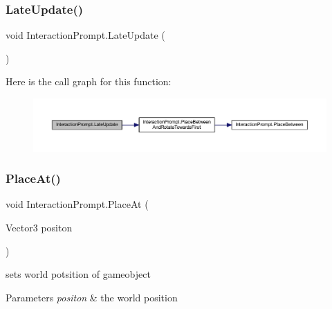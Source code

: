 \subsubsection{\texorpdfstring{Late\+Update()}{LateUpdate()}}
{\footnotesize\ttfamily void Interaction\+Prompt.\+Late\+Update (\begin{DoxyParamCaption}{ }\end{DoxyParamCaption})\hspace{0.3cm}{\ttfamily [private]}}

Here is the call graph for this function\+:\nopagebreak
\begin{figure}[H]
\begin{center}
\leavevmode
\includegraphics[width=350pt]{class_interaction_prompt_abdf8e29663a41a36dc2db027f3187c49_cgraph}
\end{center}
\end{figure}
\mbox{\label{class_interaction_prompt_affe2190bb7ca5e5476074dbbbb846b3c}} 
\subsubsection{\texorpdfstring{Place\+At()}{PlaceAt()}}
{\footnotesize\ttfamily void Interaction\+Prompt.\+Place\+At (\begin{DoxyParamCaption}\item[{Vector3}]{positon }\end{DoxyParamCaption})}



sets world potsition of gameobject 


\begin{DoxyParams}{Parameters}
{\em positon} & the world position\\
\hline
\end{DoxyParams}
\mbox{\label{class_interaction_prompt_a86cfcd9a578717260de54c04a51d6175}} 
